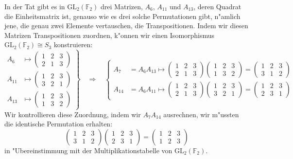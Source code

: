 \begin{beispiel}
In der Tat gibt es in $\textrm{GL}_2(\mathbb F_2)$ drei Matrizen,
$A_6$, $A_{11}$ und $A_{13}$,
deren Quadrat die Einheitsmatrix ist, genauso wie es drei solche
Permutationen gibt, n"amlich jene, die genau zwei Elemente vertauschen,
die Transpositionen.
Indem wir diesen Matrizen Transpositionen zuordnen, k"onnen wir einen
Isomorphismus $\textrm{GL}_2(\mathbb F_2)\cong S_3$ konstruieren:
\[
\left.
\begin{aligned}
A_6   &\mapsto\begin{pmatrix}1&2&3\\2&1&3\end{pmatrix}
\\
A_{11}&\mapsto\begin{pmatrix}1&2&3\\3&2&1\end{pmatrix}
\\
A_{13}&\mapsto\begin{pmatrix}1&2&3\\1&3&2\end{pmatrix}
\end{aligned}
\right\}
\quad\Rightarrow\quad
\left\{
\begin{aligned}
A_7   &=A_6A_{13}\mapsto
\begin{pmatrix}1&2&3\\2&1&3\end{pmatrix}
\begin{pmatrix}1&2&3\\1&3&2\end{pmatrix}
=
\begin{pmatrix}1&2&3\\3&1&2\end{pmatrix}
\\
A_{14}&=A_6A_{11}\mapsto
\begin{pmatrix}1&2&3\\2&1&3\end{pmatrix}
\begin{pmatrix}1&2&3\\3&2&1\end{pmatrix}
=
\begin{pmatrix}1&2&3\\2&3&1\end{pmatrix}
\end{aligned}
\right.
\]
Wir kontrollieren diese Zuordnung, indem wir $A_7A_{14}$ ausrechnen,
wir m"ussten die identische Permutation erhalten:
\[
\begin{pmatrix}1&2&3\\3&1&2\end{pmatrix}
\begin{pmatrix}1&2&3\\2&3&1\end{pmatrix}
=
\begin{pmatrix}1&2&3\\1&2&3\end{pmatrix}
\]
in "Ubereinstimmung mit der Multiplikationstabelle von
$\textrm{GL}_2(\mathbb F_2)$.
\end{beispiel}



